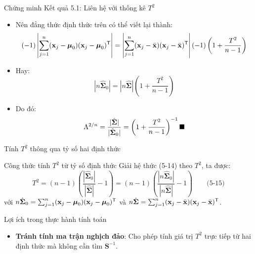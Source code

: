 \begin{frame}[t]{Chứng minh Kết quả 5.1: Liên hệ với thống kê \texorpdfstring{$T^2$}{T2}}
  \begin{itemize}
    \item Nên đẳng thức định thức trên có thể viết lại thành:
    \[
      (-1)\left| \sum_{j=1}^n (\mathbf{x}_j - \boldsymbol{\mu}_0)(\mathbf{x}_j - \boldsymbol{\mu}_0)^{\mathsf T} \right| 
      = \left| \sum_{j=1}^n (\mathbf{x}_j - \bar{\mathbf{x}})(\mathbf{x}_j - \bar{\mathbf{x}})^{\mathsf T} \right| (-1)\left( 1 + \frac{T^2}{n-1} \right)
    \]
    \item Hay:
    \[
      |n\hat{\boldsymbol{\Sigma}}_0| = |n\hat{\boldsymbol{\Sigma}}| \left( 1 + \frac{T^2}{n-1} \right)
    \]
    \item Do đó:
    \[
      \Lambda^{2/n} = \frac{|\hat{\boldsymbol{\Sigma}}|}{|\hat{\boldsymbol{\Sigma}}_0|} = \left( 1 + \frac{T^2}{n-1} \right)^{-1} \hfill \blacksquare
    \]
  \end{itemize}
\end{frame}
\begin{frame}[t]{Tính \texorpdfstring{$T^2$}{T2} thông qua tỷ số hai định thức}
  \begin{block}{Công thức tính $T^2$ từ tỷ số định thức}
    Giải hệ thức (5-14) theo $T^2$, ta được:
    \[
      T^2 = (n-1)\left(\frac{|\hat{\boldsymbol{\Sigma}}_0|}{|\hat{\boldsymbol{\Sigma}}|} - 1\right) = (n-1)\left(\frac{|n\hat{\boldsymbol{\Sigma}}_0|}{|n\hat{\boldsymbol{\Sigma}}|} - 1\right) \qquad \text{(5-15)}
    \]
    với $n\hat{\boldsymbol{\Sigma}}_0 = \sum_{j=1}^n (\mathbf{x}_j - \boldsymbol{\mu}_0)(\mathbf{x}_j - \boldsymbol{\mu}_0)^{\mathsf T}$ 
    và $n\hat{\boldsymbol{\Sigma}} = \sum_{j=1}^n (\mathbf{x}_j - \bar{\mathbf{x}})(\mathbf{x}_j - \bar{\mathbf{x}})^{\mathsf T}$.
  \end{block}

  \begin{exampleblock}{Lợi ích trong thực hành tính toán}
    \begin{itemize}
      \item \textbf{Tránh tính ma trận nghịch đảo}: Cho phép tính giá trị $T^2$ trực tiếp từ hai định thức mà không cần tìm $\mathbf{S}^{-1}$.
    \end{itemize}
  \end{exampleblock}
\end{frame}

